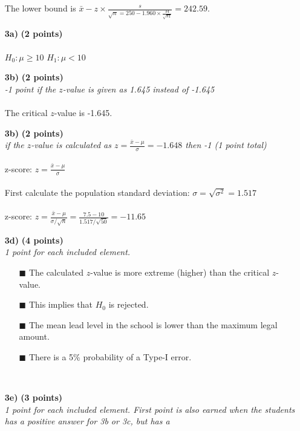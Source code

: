 \begin{itemize}
     The lower bound is $\bar{x} - z \times \frac{s}{\sqrt{n} = 250 - 1.960 \times \frac{34}{\sqrt{81}}} = 242.59$.
\item[\textbf{3a)}] \textbf{(2 points)} \\ \\
$H_0: \mu \geq 10$ \hspace{3cm} $H_1: \mu < 10$ \\
\item[\textbf{3b)}] \textbf{(2 points)} \\
\textit{-1 point if the $z$-value is given as 1.645 instead of -1.645} \\ \\
The critical $z$-value is -1.645. \\
\item[\textbf{3b)}] \textbf{(2 points)} \\
\textit{if the $z$-value is calculated as $z = \frac{\bar{x} - \mu}{\sigma} = -1.648$ then -1 (1 point total)} \\ \\
z-score: $z = \frac{\bar{x} - \mu}{\sigma}$ \\ \\
First calculate the population standard deviation: $\sigma = \sqrt{\sigma^2} = 1.517$ \\ \\
z-score: $z = \frac{\bar{x} - \mu}{\sigma / \sqrt{n}} = \frac{7.5 - 10}{1.517 / \sqrt{50}} = -11.65$ \\
\item[\textbf{3d)}] \textbf{(4 points)} \\
\textit{1 point for each included element.}
        \begin{itemize}
        \item[$\blacksquare$] The calculated $z$-value is more extreme (higher) than the critical $z$-value.
        \item[$\blacksquare$] This implies that $H_0$ is rejected.
        \item[$\blacksquare$] The mean lead level in the school is lower than the maximum legal amount.
        \item[$\blacksquare$] There is a 5\% probability of a Type-I error.
        \end{itemize} \\
\item[\textbf{3e)}] \textbf{(3 points)} \\
\textit{1 point for each included element. First point is also earned when the students has a positive answer for 3b or 3c, but has a
}
\end{itemize}
